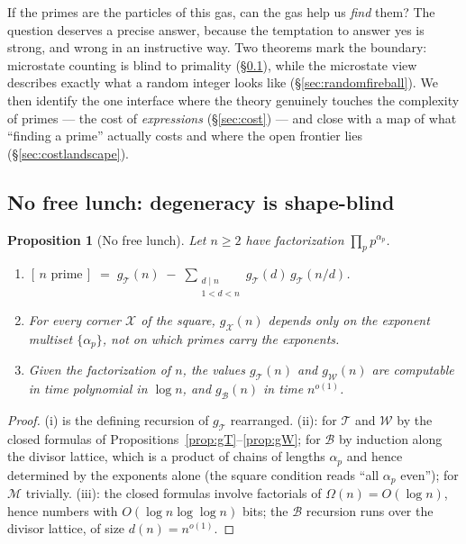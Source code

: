 \documentclass[11pt]{article}
\newcommand{\cT}{\mathcal{T}}   %
\newcommand{\cW}{\mathcal{W}}   %
\newcommand{\cB}{\mathcal{B}}   %
\newcommand{\cM}{\mathcal{M}}   %
\numberwithin{equation}{section}
\theoremstyle{plain}
\newtheorem{proposition}[theorem]{Proposition}
\theoremstyle{definition}
\theoremstyle{remark}
\begin{document}
If the primes are the particles of this gas, can the gas help us \emph{find} them?
The question deserves a precise answer, because the temptation to answer yes is
strong, and wrong in an instructive way. Two theorems mark the boundary: microstate
counting is blind to primality (\S\ref{sec:nofreelunch}), while the microstate view
describes exactly what a random integer looks like (\S\ref{sec:randomfireball}). We
then identify the one interface where the theory genuinely touches the complexity of
primes --- the cost of \emph{expressions} (\S\ref{sec:cost}) --- and close with a map
of what ``finding a prime'' actually costs and where the open frontier lies
(\S\ref{sec:costlandscape}).

\subsection{No free lunch: degeneracy is shape-blind}\label{sec:nofreelunch}

\begin{proposition}[No free lunch]\label{prop:nofreelunch}
Let $n \ge 2$ have factorization $\prod_p p^{\alpha_p}$.
\begin{enumerate}
\item[(i)] $\displaystyle [\,n \text{ prime}\,] \;=\; g_\cT(n) \;-\;
\sum_{\substack{d \mid n \\ 1<d<n}} g_\cT(d)\, g_\cT(n/d)$.
\item[(ii)] For every corner $\mathcal X$ of the square, $g_{\mathcal X}(n)$ depends
only on the exponent multiset $\{\alpha_p\}$, not on which primes carry the exponents.
\item[(iii)] Given the factorization of $n$, the values $g_\cT(n)$ and $g_\cW(n)$ are
computable in time polynomial in $\log n$, and $g_\cB(n)$ in time $n^{o(1)}$.
\end{enumerate}
\end{proposition}

\begin{proof}
(i) is the defining recursion of $g_\cT$ rearranged. (ii): for $\cT$ and $\cW$ by the
closed formulas of Propositions~\ref{prop:gT}--\ref{prop:gW}; for $\cB$ by induction
along the divisor lattice, which is a product of chains of lengths $\alpha_p$ and
hence determined by the exponents alone (the square condition reads ``all $\alpha_p$
even''); for $\cM$ trivially. (iii): the closed formulas involve factorials of
$\Omega(n) = O(\log n)$, hence numbers with $O(\log n \log\log n)$ bits; the $\cB$
recursion runs over the divisor lattice, of size $d(n) = n^{o(1)}$.
\end{proof}
\end{document}
